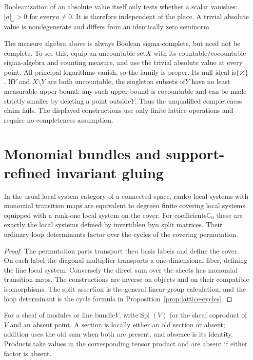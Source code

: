 Booleanization of an absolute value itself only tests whether a scalar
vanishes: $|a|_\omega>0$ for every$a\ne0$. It is therefore independent of
the place. A trivial absolute value is nondegenerate and differs from an
identically zero seminorm.

The measure algebra above is always Boolean sigma-complete, but need not
be complete. To see this, equip an uncountable set$X$ with its
countable/cocountable sigma-algebra and counting measure, and use the
trivial absolute value at every point. All principal logarithms vanish,
so the family is proper. Its null ideal is$\{\varnothing\}$. If$Y$ and
$X\setminus Y$ are both uncountable, the singleton subsets of$Y$ have no
least measurable upper bound: any such upper bound is cocountable and
can be made strictly smaller by deleting a point outside$Y$. Thus the
unqualified completeness claim fails. The displayed constructions use
only finite lattice operations and require no completeness assumption.

\section{Monomial bundles and support-refined invariant gluing}
\label{sec:monomial-invariant-gluing}
\begin{proposition}\label{prop:cover-local-system}
In the usual local-system category of a connected space, rank$n$ local
systems with monomial transition maps are equivalent to degree$n$ finite
covering local systems equipped with a rank-one local system on the cover.
For coefficients$\mathbb C_0$ these are exactly the local systems defined
by invertible$n$ by$n$ split matrices. Their ordinary loop determinants
factor over the cycles of the covering permutation.
\end{proposition}
\begin{proof}
The permutation parts transport the$n$ basis labels and define the cover.
On each label the diagonal multiplier transports a one-dimensional fiber,
defining the line local system. Conversely the direct sum over the sheets
has monomial transition maps. The constructions are inverse on objects
and on their compatible isomorphisms. The split assertion is the general
linear-group calculation, and the loop determinant is the cycle formula
in Proposition~\ref{prop:lattice-cycles}.
\end{proof}

For a sheaf of modules or line bundle$V$, write$\operatorname{Spl}(V)$ for
the sheaf coproduct of$V$ and an absent point. A section is locally either
an old section or absent; addition uses the old sum when both are present,
and absence is its identity. Products take values in the corresponding
tensor product and are absent if either factor is absent.

